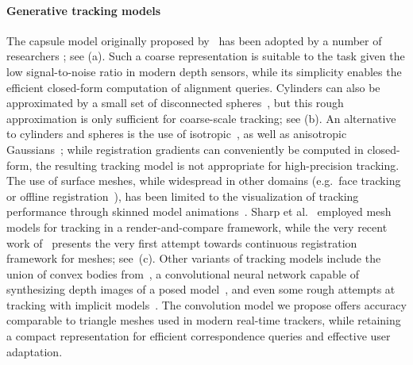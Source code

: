 \paragraph{Generative tracking models}
The capsule model originally proposed by~\cite{rehg1994tracking} has been adopted by a number of researchers \cite{oiko2011hand,schroder2014real,fleishman2015icpik,tagliasacchi2015robust}; see (a). Such a coarse representation is suitable to the task given the low signal-to-noise ratio in modern depth sensors, while its simplicity enables the efficient closed-form computation of alignment queries. Cylinders can also be approximated by a small set of disconnected spheres~\cite{qian2014realtime}, but this rough approximation is only sufficient for coarse-scale tracking; see (b). An alternative to cylinders and spheres is the use of isotropic~\cite{sridhar2013multicam,sridhar2015fast}, as well as anisotropic Gaussians~\cite{sridhar2014anisotropic}; while registration gradients can conveniently be computed in closed-form, the resulting tracking model is not appropriate for high-precision tracking.
% 
%
The use of surface meshes, while widespread in other domains (e.g.\ face tracking~\cite{bouaziz2013online} or offline registration~\cite{wang2013physics,loper_eccv14}), has been limited to the visualization of tracking performance through skinned model animations~\cite{tompson2014real,schroder2014real}. Sharp et al.~ employed mesh models for tracking in a render-and-compare framework, while the very recent work of~\cite{taylor2016concerto} presents the very first attempt towards continuous registration framework for meshes; see~(c).
%
Other variants of tracking models include the union of convex bodies from~\cite{melax2013dynamics}, a convolutional neural network capable of synthesizing depth images of a posed model~\cite{oberweger2015feedback}, and even some rough attempts at tracking with implicit models~\cite{fua2003soft}.
% 
The convolution model we propose offers accuracy comparable to triangle meshes used in modern real-time trackers, while retaining a compact representation for efficient correspondence queries and effective user adaptation.

